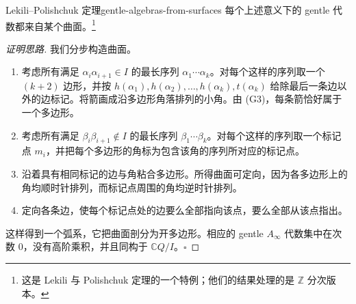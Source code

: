 \begin{theorem}{Lekili--Polishchuk 定理}{gentle-algebras-from-surfaces}
每个上述意义下的 gentle 代数都来自某个曲面。\footnote{这是 Lekili 与 Polishchuk 定理的一个特例；他们的结果处理的是 $\mathbb Z$ 分次版本。}
\end{theorem}
\begin{proof}[证明思路]
我们分步构造曲面。
\begin{enumerate}[label=(\roman*)]
  \item 考虑所有满足 $\alpha_i\alpha_{i+1}\in I$ 的最长序列 $\alpha_1\cdots\alpha_k$。对每个这样的序列取一个 $(k+2)$ 边形，并按 $h(\alpha_1),h(\alpha_2),\ldots,h(\alpha_k),t(\alpha_k)$ 给除最后一条边以外的边标记。将箭画成沿多边形角落排列的小角。由 (G3)，每条箭恰好属于一个多边形。
  \item 考虑所有满足 $\beta_i\beta_{i+1}\notin I$ 的最长序列 $\beta_1\cdots\beta_k$。对每个这样的序列取一个标记点 $m_i$，并把每个多边形的角标为包含该角的序列所对应的标记点。
  \item 沿着具有相同标记的边与角粘合多边形。所得曲面可定向，因为各多边形上的角均顺时针排列，而标记点周围的角均逆时针排列。
  \item 定向各条边，使每个标记点处的边要么全部指向该点，要么全部从该点指出。
\end{enumerate}
这样得到一个弧系，它把曲面剖分为开多边形。相应的 gentle $A_\infty$ 代数集中在次数 $0$，没有高阶乘积，并且同构于 $\mathbb C Q/I$。\hfill$\square$
\end{proof}

